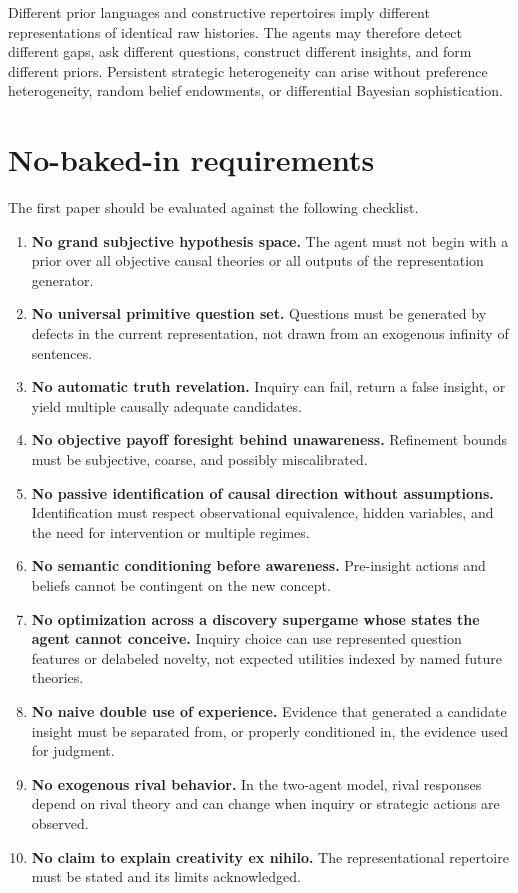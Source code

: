 \documentclass[11pt]{article}
\begin{document}
	Different prior languages and constructive repertoires imply different representations of identical raw histories.  The agents may therefore detect different gaps, ask different questions, construct different insights, and form different priors.  Persistent strategic heterogeneity can arise without preference heterogeneity, random belief endowments, or differential Bayesian sophistication.
	
	\section{No-baked-in requirements}
	
	The first paper should be evaluated against the following checklist.
	
	\begin{enumerate}
		\item \textbf{No grand subjective hypothesis space.}  The agent must not begin with a prior over all objective causal theories or all outputs of the representation generator.
		\item \textbf{No universal primitive question set.}  Questions must be generated by defects in the current representation, not drawn from an exogenous infinity of sentences.
		\item \textbf{No automatic truth revelation.}  Inquiry can fail, return a false insight, or yield multiple causally adequate candidates.
		\item \textbf{No objective payoff foresight behind unawareness.}  Refinement bounds must be subjective, coarse, and possibly miscalibrated.
		\item \textbf{No passive identification of causal direction without assumptions.}  Identification must respect observational equivalence, hidden variables, and the need for intervention or multiple regimes.
		\item \textbf{No semantic conditioning before awareness.}  Pre-insight actions and beliefs cannot be contingent on the new concept.
		\item \textbf{No optimization across a discovery supergame whose states the agent cannot conceive.}  Inquiry choice can use represented question features or delabeled novelty, not expected utilities indexed by named future theories.
		\item \textbf{No naive double use of experience.}  Evidence that generated a candidate insight must be separated from, or properly conditioned in, the evidence used for judgment.
		\item \textbf{No exogenous rival behavior.}  In the two-agent model, rival responses depend on rival theory and can change when inquiry or strategic actions are observed.
		\item \textbf{No claim to explain creativity ex nihilo.}  The representational repertoire must be stated and its limits acknowledged.
	\end{enumerate}
	
\end{document}
